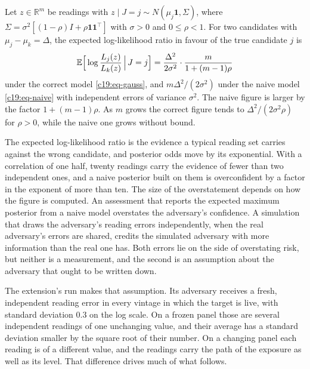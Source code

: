 \begin{proposition}\label{c19:prop-corr}
Let $z\in\mathbb R^m$ be readings with $z\mid J=j\sim N(\mu_j\mathbf 1,\Sigma)$, where $\Sigma=\sigma^2[(1-\rho)I+\rho\mathbf 1\mathbf 1^\top]$ with $\sigma>0$ and $0\le\rho<1$. For two
candidates with $\mu_j-\mu_k=\Delta$, the expected log-likelihood ratio in favour of the true candidate $j$ is
\begin{equation}\label{c19:eq-llr}
\mathbb{E}\Big[\log\frac{L_j(z)}{L_k(z)}\,\Big|\,J=j\Big]=\frac{\Delta^2}{2\sigma^2}\cdot\frac{m}{1+(m-1)\rho}
\end{equation}
under the correct model \eqref{c19:eq-gauss}, and $m\Delta^2/(2\sigma^2)$ under the naive model \eqref{c19:eq-naive} with independent
errors of variance $\sigma^2$. The naive figure is larger by the factor $1+(m-1)\rho$. As $m$ grows the correct
figure tends to $\Delta^2/(2\sigma^2\rho)$ for $\rho>0$, while the naive one grows without bound.
\end{proposition}

The expected log-likelihood ratio is the evidence a typical reading set carries against
the wrong candidate, and posterior odds move by its exponential. With a correlation of
one half, twenty readings carry the evidence of fewer than two independent ones, and a
naive posterior built on them is overconfident by a factor in the exponent of more than
ten. The size of the overstatement depends on how the figure is computed. An assessment that reports the expected
maximum posterior from a naive model overstates the adversary's confidence. A simulation
that draws the adversary's reading errors independently, when the real adversary's errors
are shared, credits the simulated adversary with more information than the real one has.
Both errors lie on the side of overstating risk, but neither is a measurement, and the second
is an assumption about the adversary that ought to be written down.

The extension's run makes that assumption. Its adversary receives a fresh, independent
reading error in every vintage in which the target is live, with standard deviation $0.3$ on
the log scale. On a frozen panel those are several independent readings of one unchanging
value, and their average has a standard deviation smaller by the square root of their number.
On a changing panel each reading is of a different value, and the readings carry the path of
the exposure as well as its level. That difference drives much of what follows.

